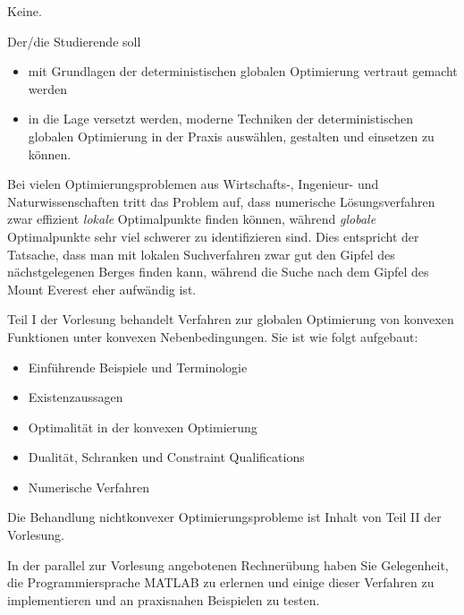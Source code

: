\begin{course}
\begin{styleenv}
\begin{assessment}
\end{assessment}

\begin{conditions}Keine.\end{conditions}


\end{styleenv}

\begin{learningoutcomes}
Der/die Studierende soll

 \begin{itemize}\item mit Grundlagen der deterministischen globalen Optimierung vertraut gemacht werden  \item in die Lage versetzt werden, moderne Techniken der deterministischen globalen Optimierung in der Praxis auswählen, gestalten und einsetzen zu können.  \end{itemize}
\end{learningoutcomes}

\begin{content}
Bei vielen Optimierungsproblemen aus Wirtschafts-, Ingenieur- und Naturwissenschaften tritt das Problem auf, dass numerische Lösungsverfahren zwar effizient \emph{lokale }Optimalpunkte finden können, während \emph{globale }Optimalpunkte sehr viel schwerer zu identifizieren sind. Dies entspricht der Tatsache, dass man mit lokalen Suchverfahren zwar gut den Gipfel des nächstgelegenen Berges finden kann, während die Suche nach dem Gipfel des Mount Everest eher aufwändig ist.

 

Teil I der Vorlesung behandelt Verfahren zur globalen Optimierung von konvexen Funktionen unter konvexen Nebenbedingungen. Sie ist wie folgt aufgebaut:

 \begin{itemize}\item Einführende Beispiele und Terminologie  \item Existenzaussagen  \item Optimalität in der konvexen Optimierung  \item Dualität, Schranken und Constraint Qualifications  \item Numerische Verfahren  \end{itemize}

Die Behandlung nichtkonvexer Optimierungsprobleme ist Inhalt von Teil II der Vorlesung.

 

In der parallel zur Vorlesung angebotenen Rechnerübung haben Sie Gelegenheit, die Programmiersprache MATLAB zu erlernen und einige dieser Verfahren zu implementieren und an praxisnahen Beispielen zu testen.



\end{content}
\end{course}
